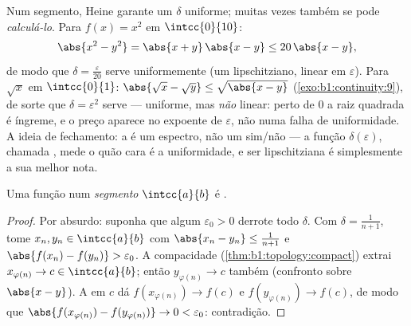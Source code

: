 \begin{example}\label{ex:b1:continuity:moduli}
Num segmento, Heine garante um $\delta$ uniforme; muitas vezes também
se pode \emph{calculá-lo}. Para $f(x) = x^2$ em $\intcc{0}{10}$:
\[
\abs{x^2 - y^2} = \abs{x + y}\,\abs{x - y} \leq 20\,\abs{x - y},
\]
de modo que $\delta = \frac{\varepsilon}{20}$ serve uniformemente (um
 lipschitziano, linear em $\varepsilon$). Para $\sqrt x$ em
$\intcc{0}{1}$: $\abs{\sqrt x - \sqrt y} \leq \sqrt{\abs{x -
y}}$ (\cref{exo:b1:continuity:9}), de sorte que $\delta = \varepsilon^2$
serve --- uniforme, mas \emph{não} linear: perto de $0$ a raiz
quadrada é íngreme, e o preço aparece no expoente de
$\varepsilon$, não numa falha de uniformidade. A ideia de
fechamento: a  é um espectro, não um sim/não ---
a função $\delta(\varepsilon)$, chamada , mede
o quão cara é a uniformidade, e ser lipschitziana é simplesmente a sua
melhor nota.
\end{example}

\begin{theorem}[Heine]\label{thm:b1:continuity:heine}
Uma função  num \emph{segmento} $\intcc{a}{b}$ é .
\end{theorem}

\begin{proof}
Por absurdo: suponha que algum $\varepsilon_0 > 0$ derrote todo
$\delta$. Com $\delta = \frac{1}{n+1}$, tome $x_n, y_n \in
\intcc{a}{b}$ com $\abs{x_n - y_n} \leq \frac{1}{n+1}$ e
$\abs{f(x_n) - f(y_n)} > \varepsilon_0$. A compacidade
(\cref{thm:b1:topology:compact}) extrai $x_{\varphi(n)} \to c \in
\intcc{a}{b}$; então $y_{\varphi(n)} \to c$ também (confronto sobre $\abs{x -
y}$). A  em $c$ dá $f(x_{\varphi(n)}) \to f(c)$ e
$f(y_{\varphi(n)}) \to f(c)$, de modo que $\abs{f(x_{\varphi(n)}) -
f(y_{\varphi(n)})} \to 0 < \varepsilon_0$: contradição.
\end{proof}

